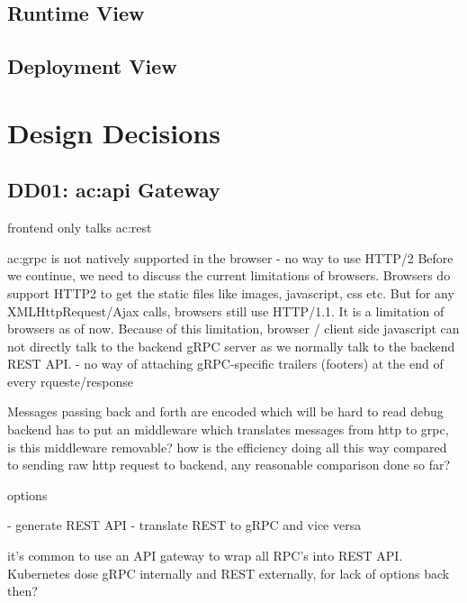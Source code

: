 \subsection{Runtime View}

\subsection{Deployment View}

\section{Design Decisions}

\subsection{DD01: \gls{ac:api} Gateway}

frontend only talks \gls{ac:rest}


\gls{ac:grpc} is not natively supported in the browser 
- no way to use HTTP/2
Before we continue, we need to discuss the current limitations of browsers. Browsers do support HTTP2 to get the static files like images, javascript, css etc. But for any XMLHttpRequest/Ajax calls, browsers still use HTTP/1.1. It is a limitation of browsers as of now. Because of this limitation, browser / client side javascript can not directly talk to the backend gRPC server as we normally talk to the backend REST API. 
- no way of attaching gRPC-specific trailers (footers) at the end of every rqueste/response

Messages passing back and forth are encoded which will be hard to read debug
backend has to put an middleware which translates messages from http to grpc, is this middleware removable?
how is the efficiency doing all this way compared to sending raw http request to backend, any reasonable comparison done so far?

options

- generate REST API
- translate REST to gRPC and vice versa


it’s common to use an API gateway to wrap all RPC’s into REST API. Kubernetes dose gRPC internally and REST externally, for lack of options back then?

